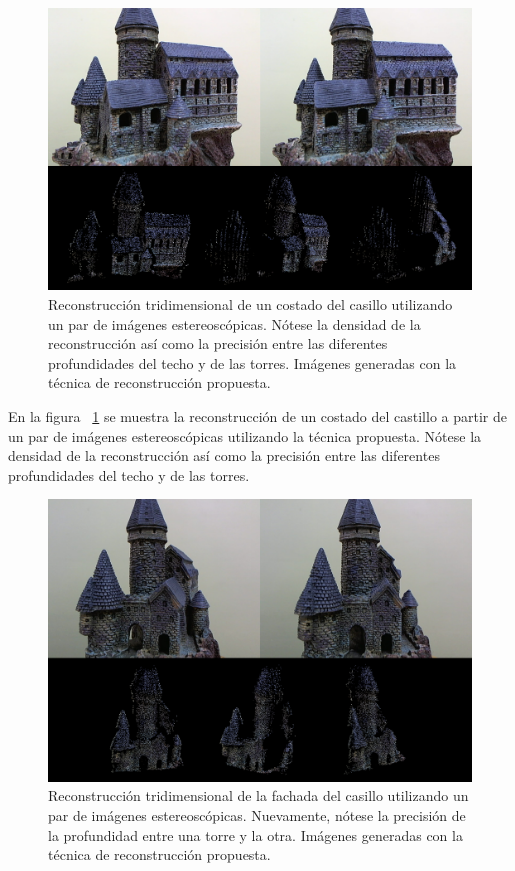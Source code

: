 \begin{figure}[H]
\centering
\includegraphics[width=1.0\textwidth]{images/reconstruction1.png}
\caption[Reconstrucci\'{o}n de un costado del castillo]%
{Reconstrucci\'{o}n tridimensional de un costado del casillo utilizando un par de im\'{a}genes estereosc\'{o}picas. N\'{o}tese la densidad de la reconstrucci\'{o}n as\'{i} como la precisi\'{o}n entre las diferentes profundidades del techo y de las torres. Im\'{a}genes generadas con la t\'{e}cnica de reconstrucción propuesta.}
\label{fig:Reconstruction1}
\end{figure}

En la figura ~\ref{fig:Reconstruction1} se muestra la reconstrucci\'{o}n de un costado del castillo a partir de un par de im\'{a}genes estereosc\'{o}picas utilizando la t\'{e}cnica propuesta. N\'{o}tese la densidad de la reconstrucci\'{o}n as\'{i} como la precisi\'{o}n entre las diferentes profundidades del techo y de las torres.


\begin{figure}[H]
\centering
\includegraphics[width=1.0\textwidth]{images/reconstruction2.png}
\caption[Reconstrucci\'{o}n de la fachada del castillo]%
{Reconstrucci\'{o}n tridimensional de la fachada del casillo utilizando un par de im\'{a}genes estereosc\'{o}picas. Nuevamente, n\'{o}tese la precisi\'{o}n de la profundidad entre una torre y la otra. Im\'{a}genes generadas con la t\'{e}cnica de reconstrucción propuesta.}
\label{fig:Reconstruction2}
\end{figure}


